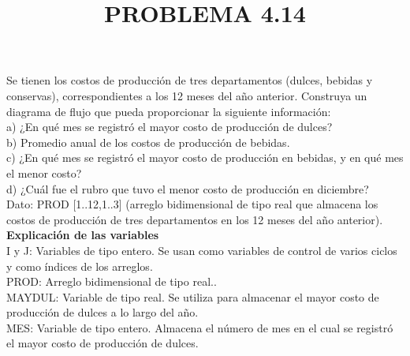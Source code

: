\documentclass[11pt]{amsart}
\title{PROBLEMA 4.14}
\begin{document}
\maketitle

\noindent Se tienen los costos de producción de tres departamentos (dulces, bebidas y conservas), correspondientes a los 12 meses del año anterior. Construya un diagrama de flujo que pueda proporcionar la siguiente información:\\

\noindent \quad a) ¿En qué mes se registró el mayor costo de producción de dulces?\\

\noindent \quad b) Promedio anual de los costos de producción de bebidas.\\

\noindent \quad c) ¿En qué mes se registró el mayor costo de producción en bebidas, y en qué mes el menor costo?\\

\noindent \quad d) ¿Cuál fue el rubro que tuvo el menor costo de producción en diciembre?\\

\noindent Dato: PROD [1..12,1..3] (arreglo bidimensional de tipo real que almacena los costos de producción de tres departamentos en los 12 meses del año anterior).\\

\noindent \textbf {Explicación de las variables} \\

\noindent \quad I y J: Variables de tipo entero. Se usan como variables de control de varios ciclos y como índices de los arreglos.\\

\noindent \quad PROD: Arreglo bidimensional de tipo real..\\

\noindent \quad MAYDUL: Variable de tipo real. Se utiliza para almacenar el mayor costo de producción de dulces a lo largo del año.\\

\noindent \quad MES: Variable de tipo entero. Almacena el número de mes en el cual se registró el mayor costo de producción de dulces.\\
\end{document}
